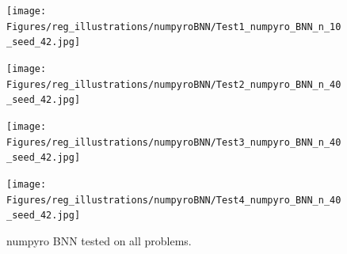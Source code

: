 \begin{figure}[h]
    \centering
    \begin{minipage}[b]{0.49\textwidth}
     \texttt{[image: Figures/reg\_illustrations/numpyroBNN/Test1\_numpyro\_BNN\_n\_10\_seed\_42.jpg]}
    \end{minipage}
    \hfill
    \begin{minipage}[b]{0.49\textwidth}
      \texttt{[image: Figures/reg\_illustrations/numpyroBNN/Test2\_numpyro\_BNN\_n\_40\_seed\_42.jpg]}
     \end{minipage}
    
     \begin{minipage}[b]{0.49\textwidth}
      \texttt{[image: Figures/reg\_illustrations/numpyroBNN/Test3\_numpyro\_BNN\_n\_40\_seed\_42.jpg]}
     \end{minipage}
     \hfill
     \begin{minipage}[b]{0.49\textwidth}
       \texttt{[image: Figures/reg\_illustrations/numpyroBNN/Test4\_numpyro\_BNN\_n\_40\_seed\_42.jpg]}
      \end{minipage}
      \caption{numpyro BNN tested on all problems.}
\end{figure}